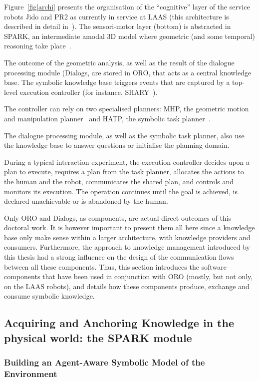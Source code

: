 Figure~\ref{fig|archi} presents the organisation of the ``cognitive'' layer of
the service robots Jido and PR2 as currently in service at LAAS (this
architecture is described in detail in~\cite{Alami2011}). The sensori-motor
layer (bottom) is abstracted in SPARK, an intermediate amodal 3D model where
geometric (and some temporal) reasoning take place~\cite{Sisbot2011}.

The outcome of the geometric analysis, as well as the result of the dialogue
processing module ({\sc Dialogs}, are stored in ORO, that acts as a central
knowledge base. The symbolic knowledge base triggers events that are captured
by a top-level execution controller (for instance, SHARY~\cite{Warnier2012}).

The controller can rely on two specialised planners: MHP, the geometric motion
and manipulation planner~\cite{Sisbot2008, Mainprice2011, Pandey2010} and HATP,
the symbolic task planner~\cite{Alili2009}.

The dialogue processing module, as well as the symbolic task planner, also use
the knowledge base to answer questions or initialise the planning domain.

During a typical interaction experiment, the execution controller decides upon
a plan to execute, requires a plan from the task planner, allocates the actions
to the human and the robot, communicates the shared plan, and controls and
monitors its execution. The operation continues until the goal is achieved, is
declared unachievable or is abandoned by the human.

Only ORO and Dialogs, as components, are actual direct outcomes of this
doctoral work. It is however important to present them all here since a
knowledge base only make sense within a larger architecture, with knowledge
providers and consumers.  Furthermore, the approach to knowledge management
introduced by this thesis had a strong influence on the design of the
communication flows between all these components. Thus, this section introduces
the software components that have been used in conjunction with ORO (mostly,
but not only, on the LAAS robots), and details how these components produce,
exchange and consume symbolic knowledge.

\subsection{Acquiring and Anchoring Knowledge in the physical world: the SPARK module}
\label{sect|spark}

\subsubsection{Building an Agent-Aware Symbolic Model of the Environment}
\label{sect|situ}

